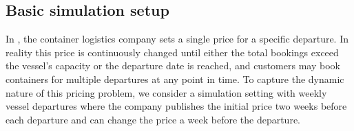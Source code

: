 \documentclass[12pt,a4paper]{article}
\theoremstyle{definition}
\begin{document}

\subsection{Basic simulation setup}

In , the container logistics company sets
a single price for a specific departure. In
reality this price is continuously changed until either the total
bookings exceed the vessel's capacity or the departure date is
reached,
and customers may book containers for multiple
departures at any point in time. To capture the dynamic nature of this
pricing problem, we consider a
simulation setting with weekly vessel departures where
the company publishes the initial price two weeks before each
departure and can change the price a week before the departure.
\end{document}
